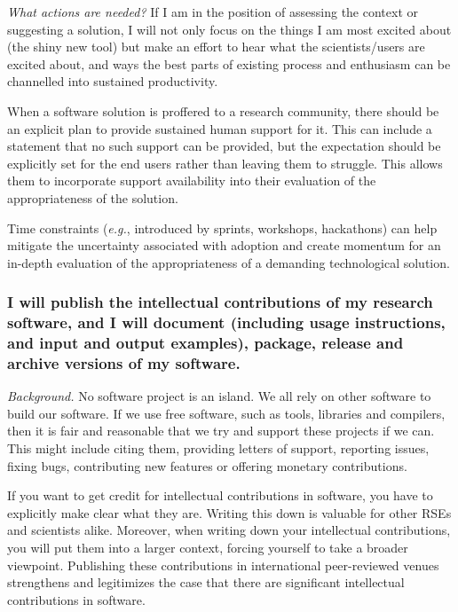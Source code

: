 \documentclass[a4paper,UKenglish]{dagman}
\renewcommand{\paragraph}[1]{\subsubsection*{#1}\xspace}
\newcommand{\eg}{\emph{e.g.},\xspace}
\begin{document}
\emph{What actions are needed?}
If I am in the position of assessing the context or suggesting a solution, I will not only focus on the things I am most excited about (the shiny new tool) but make an effort to hear what the scientists/users are excited about, and ways the best parts of existing process and enthusiasm can be channelled into sustained productivity.

When a software solution is proffered to a research community, there should be an explicit plan to provide sustained human support for it. This can include a statement that no such support can be provided, but the expectation should be explicitly set for the end users rather than leaving them to struggle. This allows them to incorporate support availability into their evaluation of the appropriateness of the solution. 


Time constraints (\eg introduced by sprints, workshops, hackathons) can help mitigate the uncertainty associated with adoption and create momentum for an in-depth evaluation of the appropriateness of a demanding technological solution.

\paragraph{I will publish the intellectual contributions of my research software, and I will document (including usage instructions, and input and output examples), package, release and archive versions of my software.}

\emph{Background.}
No software project is an island. We all rely on other software to build our software. If we use free software, such as tools, libraries and compilers, then it is fair and reasonable that we try and support these projects if we can. This might include citing them, providing letters of support, reporting issues, fixing bugs, contributing new features or offering monetary contributions.

If you want to get credit for intellectual contributions in software, you have to explicitly make clear what they are. Writing this down is valuable for other RSEs and scientists alike. Moreover, when writing down your intellectual contributions, you will put them into a larger context, forcing yourself to take a broader viewpoint. Publishing these contributions in international peer-reviewed venues strengthens and legitimizes the case that there are significant intellectual contributions in software.
\end{document}
